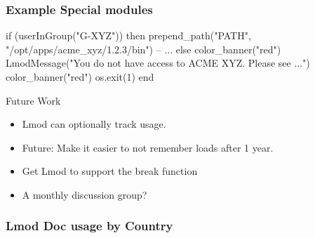\documentclass{beamer}
\begin{document}
\begin{frame}[fragile]
\frametitle{Example Special modules}
{\tiny
\begin{semiverbatim}
    if (userInGroup("G-XYZ")) then
       prepend\_path("PATH", "/opt/apps/acme\_xyz/1.2.3/bin")
       -- ...
    else
       color\_banner("red")
       LmodMessage("You do not have access to ACME XYZ.  Please see ...")
       color\_banner("red")
       os.exit(1)
    end
\end{semiverbatim}
}
\end{frame}


\begin{frame}{Future Work}
  \begin{itemize}
    \item Lmod can optionally track usage.
    \item Future: Make it easier to not remember loads after 1 year.
    \item Get Lmod to support the break function
    \item A monthly discussion group?
  \end{itemize}
\end{frame}


\begin{frame}[fragile]
    \frametitle{Lmod Doc usage by Country}
\end{frame}
\end{document}
